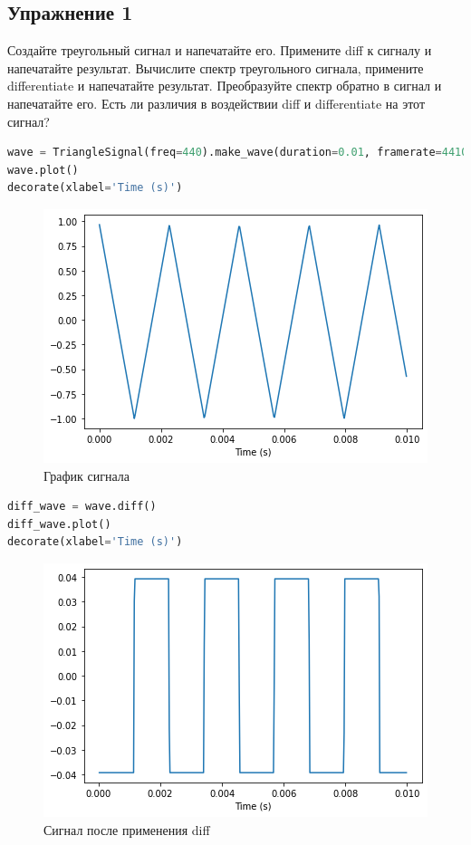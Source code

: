 \subsection{Упражнение 1}

Создайте треугольный сигнал и напечатайте его. Примените diff к сигналу и напечатайте результат. Вычислите спектр треугольного сигнала, примените differentiate и напечатайте результат. Преобразуйте спектр обратно в сигнал и напечатайте его. Есть ли различия в воздействии diff и differentiate на этот сигнал?

\begin{lstlisting}[language=Python]
wave = TriangleSignal(freq=440).make_wave(duration=0.01, framerate=44100)
wave.plot()
decorate(xlabel='Time (s)')
\end{lstlisting}
\begin{figure}[H]
	\begin{center}
		\includegraphics[scale=1]{fig/lab09/lab09_3_0.png}
		\caption{График сигнала}
	\end{center}
\end{figure}

\begin{lstlisting}[language=Python]
diff_wave = wave.diff()
diff_wave.plot()
decorate(xlabel='Time (s)')
\end{lstlisting}
\begin{figure}[H]
	\begin{center}
		\includegraphics[scale=1]{fig/lab09/lab09_4_0.png}
		\caption{Сигнал после применения diff}
	\end{center}
\end{figure}

